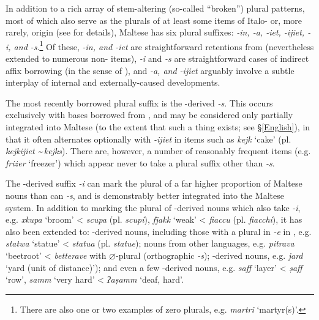 \documentclass[output=paper]{langsci/langscibook}
\begin{document}
In addition to a rich array of stem-altering (so-called ``broken'') plural patterns, most of which also serve as the plurals of at least some items of Italo- or, more rarely,  origin (see \citealt{spagnol2011} for details), Maltese has six plural suffixes: \textit{-in, -a, -iet, -ijiet, -i, \textnormal{and} -s}.\footnote{There are also one or two examples of zero plurals, e.g. \textit{martri} `martyr(s)'.} Of these, \textit{-in, \textnormal{and} -iet} are straightforward retentions from  (nevertheless extended to numerous non- items), \textit{-i} and \textit{-s} are straightforward cases of indirect affix borrowing (in the sense of \citealt{Seifart2015}), and \textit{-a, \textnormal{and} -ijiet} arguably involve a subtle interplay of internal and externally-caused developments.

The most recently borrowed plural suffix is the -derived \textit{-s}. This occurs exclusively with bases borrowed from , and may be considered only partially integrated into  Maltese (to the extent that such a thing exists; see §\ref{English}), in that it often alternates optionally with \textit{-ijiet} in items such as \textit{kejk} `cake' (pl. \textit{kejkijiet \textasciitilde \,kejks}). There are, however, a number of reasonably frequent items (e.g. \textit{friżer} `freezer') which appear never to take a plural suffix other than \textit{-s}.


The -derived suffix \textit{-i} can mark the plural of a far higher proportion of Maltese nouns than can \textit{-s}, and is demonstrably better integrated into the Maltese  system. In addition to marking the plural of -derived nouns which also take \textit{-i}, e.g. \textit{xkupa} `broom' <  \textit{scupa} (pl. \textit{scupi}), \textit{fjakk} `weak' <  \textit{fiaccu} (pl. \textit{fiacchi}), it has also been extended to: -derived nouns, including those with a plural in \textit{-e} in , e.g. \textit{statwa} `statue' <  \textit{statua} (pl. \textit{statue}); nouns from other  languages, e.g. \textit{pitrava} `beetroot' <  \textit{betterave} with $\varnothing$-plural (orthographic \textit{-s}); -derived nouns, e.g. \textit{jard} `yard (unit of distance)'); and even a few -derived nouns, e.g. \textit{saff} `layer' < \textit{\d{s}aff} `row', \textit{samm} `very hard' < \textit{ʔa\d{s}amm} `deaf, hard'.
\end{document}
